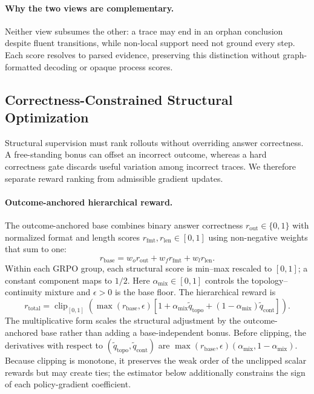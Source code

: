 \paragraph{Why the two views are complementary.}
Neither view subsumes the other: a trace may end in an orphan conclusion despite fluent transitions, while non-local support need not ground every step. Each score resolves to parsed evidence, preserving this distinction without graph-formatted decoding or opaque process scores.

\subsection{Correctness-Constrained Structural Optimization}
\label{sec:post_training}

Structural supervision must rank rollouts without overriding answer correctness. A free-standing bonus can offset an incorrect outcome, whereas a hard correctness gate discards useful variation among incorrect traces. We therefore separate reward ranking from admissible gradient updates.

\paragraph{Outcome-anchored hierarchical reward.}
The outcome-anchored base combines binary answer correctness $r_{\mathrm{out}}\in\{0,1\}$ with normalized format and length scores $r_{\mathrm{fmt}},r_{\mathrm{len}}\in[0,1]$ using non-negative weights that sum to one:
\begin{equation}
\label{eq:rbase}
r_{\mathrm{base}}=w_o r_{\mathrm{out}}+w_f r_{\mathrm{fmt}}+w_l r_{\mathrm{len}}.
\end{equation}
Within each GRPO group, each structural score is min--max rescaled to $[0,1]$; a constant component maps to $1/2$. Here $\alpha_{\mathrm{mix}}\in[0,1]$ controls the topology--continuity mixture and $\epsilon>0$ is the base floor. The hierarchical reward is
\begin{equation}
\label{eq:r_total}
r_{\mathrm{total}}=\operatorname{clip}_{[0,1]}\!\left(
\max(r_{\mathrm{base}},\epsilon)
    \left[1+\alpha_{\mathrm{mix}}\widetilde q_{\mathrm{topo}}+(1-\alpha_{\mathrm{mix}})\widetilde q_{\mathrm{cont}}\right]\right).
\end{equation}
The multiplicative form scales the structural adjustment by the outcome-anchored base rather than adding a base-independent bonus. Before clipping, the derivatives with respect to $(\widetilde q_{\mathrm{topo}},\widetilde q_{\mathrm{cont}})$ are $\max(r_{\mathrm{base}},\epsilon)(\alpha_{\mathrm{mix}},1-\alpha_{\mathrm{mix}})$. Because clipping is monotone, it preserves the weak order of the unclipped scalar rewards but may create ties; the estimator below additionally constrains the sign of each policy-gradient coefficient.

